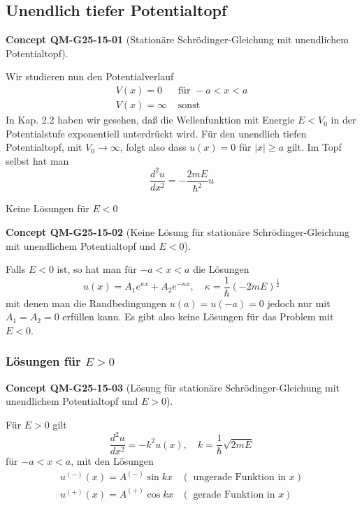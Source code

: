 \documentclass[10pt, letterpaper]{article}
\newcommand{\CustomHeading}[3]{%
  \par\medskip\noindent%
  \textbf{#1 #2} \textnormal{(#3)}.\enskip%
}
\newenvironment{CONC}[2]{\begin{unitbox}\CustomHeading{Concept}{#1}{#2}}{\end{unitbox}}
\begin{document}
\subsection*{Unendlich tiefer Potentialtopf}


\begin{CONC}{QM-G25-15-01}{Stationäre Schrödinger-Gleichung mit unendlichem Potentialtopf}
Wir studieren nun den Potentialverlauf
$$
\begin{array}{ll}
V(x)=0 & \text { für }-a<x<a \\
V(x)=\infty & \text { sonst }
\end{array}
$$
In Kap. 2.2 haben wir gesehen, daß die Wellenfunktion mit Energie $E<V_{0}$ in der Potentialstufe exponentiell unterdrückt wird. Für den unendlich tiefen Potentialtopf, mit $V_{0} \rightarrow \infty$, folgt also dass $u(x)=0$ für $|x| \geq a$ gilt. Im Topf selbst hat man
$$
\frac{d^{2} u}{d x^{2}}=-\frac{2 m E}{\hbar^{2}} u
$$
\end{CONC}

Keine Lösungen für $E<0$

\begin{CONC}{QM-G25-15-02}{Keine Lösung für stationäre Schrödinger-Gleichung mit unendlichem Potentialtopf und $E<0$}
Falls $E<0$ ist, so hat man für $-a<x<a$ die Lösungen
$$
u(x)=A_{1} e^{\kappa x}+A_{2} e^{-\kappa x}, \quad \kappa=\frac{1}{\hbar}(-2 m E)^{\frac{1}{2}}
$$
mit denen man die Randbedingungen $u(a)=u(-a)=0$ jedoch nur mit $A_{1}=A_{2}=0$ erfüllen kann. Es gibt also keine Lösungen für das Problem mit $E<0$.
\end{CONC}

\subsubsection*{Lösungen für $E>0$}

\begin{CONC}{QM-G25-15-03}{Lösung für stationäre Schrödinger-Gleichung mit unendlichem Potentialtopf und $E>0$}
Für $E>0$ gilt
$$
\frac{d^{2} u}{d x^{2}}=-k^{2} u(x), \quad k=\frac{1}{\hbar} \sqrt{2 m E}
$$
für $-a<x<a$, mit den Lösungen
$$
\begin{array}{ll}
u^{(-)}(x)=A^{(-)} \sin k x & (\text { ungerade Funktion in } x) \\
u^{(+)}(x)=A^{(+)} \cos k x & (\text { gerade Funktion in } x)
\end{array}
$$
\end{CONC}
\end{document}
